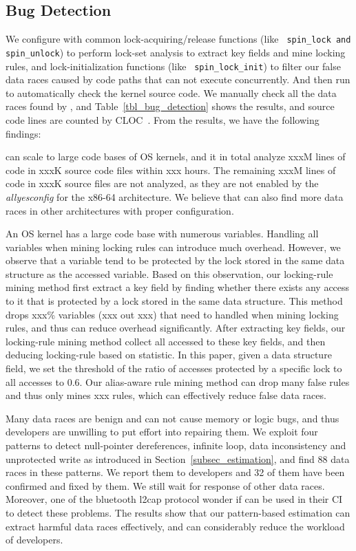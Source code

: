 \subsection{Bug Detection}
\label{subsec_bug_detection}

We configure \sys with common lock-acquiring/release functions (like {\tt 
spin\_lock and spin\_unlock}) to perform lock-set analysis to extract key 
fields and mine locking rules, and lock-initialization functions (like {\tt 
spin\_lock\_init}) to filter our false data races caused by code paths that 
can not execute concurrently. And then run \sys to automatically check the 
kernel source code. We manually check all the data races found by \sys, and 
Table~\ref{tbl_bug_detection} shows the results, and source code lines are 
counted by CLOC~\cite{cloc}. From the results, we have the following findings:

 \sys can scale to large code bases of OS kernels, and it in 
total analyze xxxM lines of code in xxxK source code files within xxx hours. 
The remaining xxxM lines of code in xxxK source files are not analyzed, as they 
are not enabled by the {\em allyesconfig} for the x86-64 architecture. We 
believe that \sys can also find more data races in other architectures with 
proper configuration.

 An OS kernel has a large code base with numerous 
variables. Handling all variables when mining locking rules can introduce much 
overhead. However, we observe that a variable tend to be protected by the lock 
stored in the same data structure as the accessed variable. Based on this 
observation, our locking-rule mining method first extract a key field by 
finding whether there exists any access to it that is protected by a lock 
stored in the same data structure. This method drops xxx\% variables (xxx out 
xxx) that need to handled when mining locking rules, and thus can reduce 
overhead significantly. After extracting key fields, our locking-rule mining 
method collect all accessed to these key fields, and then deducing locking-rule 
based on statistic. In this paper, given a data structure field, we set the 
threshold of the ratio of accesses protected by a specific lock to all accesses 
to 0.6. Our alias-aware rule mining method can drop many false rules and thus 
only mines xxx rules, which can effectively reduce false data races.


 Many data races are benign and can not cause memory 
or logic bugs, and thus developers are unwilling to put effort into repairing 
them. We exploit four patterns to detect null-pointer dereferences, infinite 
loop, data inconsistency and unprotected write as introduced in 
Section~\ref{subsec_estimation}, and find 88 data races in these patterns. We 
report them to developers and 32 of them have been confirmed and fixed by them. 
We still wait for response of other data races. Moreover, one of the bluetooth 
l2cap protocol wonder if \sys can be used in their CI to detect these problems. 
The results show that our pattern-based estimation can extract harmful data 
races effectively, and can considerably reduce the workload of developers.
